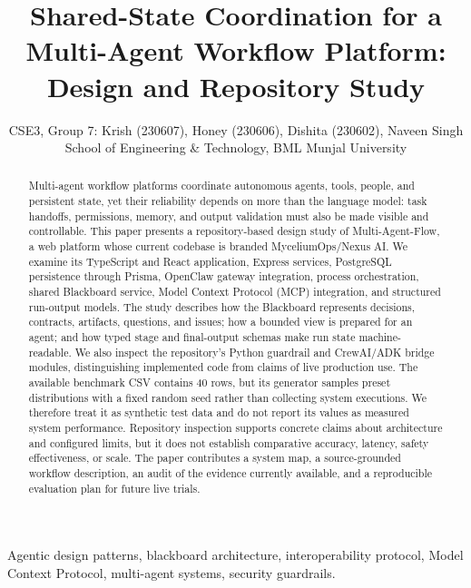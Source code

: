\documentclass[12pt,onecolumn,draftclsnofoot]{IEEEtran}
\begin{document}
\title{Shared-State Coordination for a Multi-Agent Workflow Platform: Design and Repository Study}

\author{CSE3, Group 7: Krish (230607), Honey (230606), Dishita (230602), Naveen Singh\\
School of Engineering \& Technology, BML Munjal University}

\maketitle

\begin{abstract}
Multi-agent workflow platforms coordinate autonomous agents, tools, people, and persistent state, yet their reliability depends on more than the language model: task handoffs, permissions, memory, and output validation must also be made visible and controllable. This paper presents a repository-based design study of Multi-Agent-Flow, a web platform whose current codebase is branded MyceliumOps/Nexus AI. We examine its TypeScript and React application, Express services, PostgreSQL persistence through Prisma, OpenClaw gateway integration, process orchestration, shared Blackboard service, Model Context Protocol (MCP) integration, and structured run-output models. The study describes how the Blackboard represents decisions, contracts, artifacts, questions, and issues; how a bounded view is prepared for an agent; and how typed stage and final-output schemas make run state machine-readable. We also inspect the repository's Python guardrail and CrewAI/ADK bridge modules, distinguishing implemented code from claims of live production use. The available benchmark CSV contains 40 rows, but its generator samples preset distributions with a fixed random seed rather than collecting system executions. We therefore treat it as synthetic test data and do not report its values as measured system performance. Repository inspection supports concrete claims about architecture and configured limits, but it does not establish comparative accuracy, latency, safety effectiveness, or scale. The paper contributes a system map, a source-grounded workflow description, an audit of the evidence currently available, and a reproducible evaluation plan for future live trials.
\end{abstract}

\begin{IEEEkeywords}
Agentic design patterns, blackboard architecture, interoperability protocol, Model Context Protocol, multi-agent systems, security guardrails.
\end{IEEEkeywords}
\end{document}
